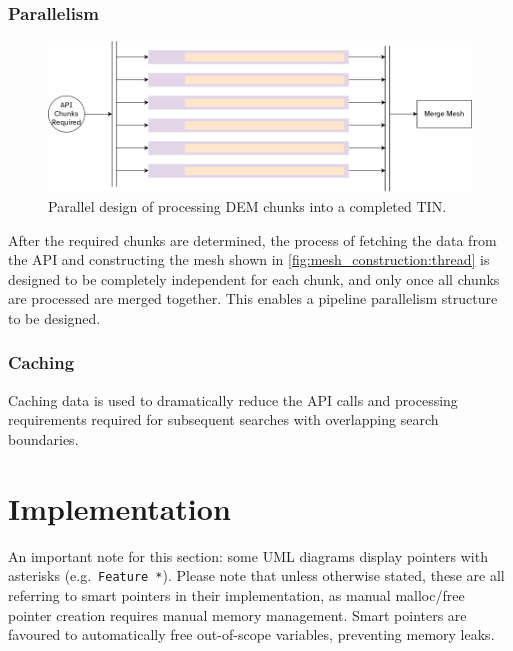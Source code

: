 \documentclass[12pt]{article}
\begin{document}
\subsubsection{Parallelism}

\begin{figure}[!htbp]
  \centering
  \includegraphics[width=1\textwidth]{assets/meshConstruction_parallel.png}
  \caption{Parallel design of processing DEM chunks into a completed TIN.}
\end{figure}

After the required chunks are determined, the process of fetching the data from the API and constructing the mesh shown in \autoref{fig:mesh_construction:thread} is designed to be completely independent for each chunk, and only once all chunks are processed are merged together. This enables a pipeline parallelism structure to be designed.

\subsubsection{Caching}

Caching data is used to dramatically reduce the API calls and processing requirements required for subsequent searches with overlapping search boundaries.


\section{Implementation}

An important note for this section: some UML diagrams display pointers with asterisks (e.g.\ \texttt{Feature *}). Please note that unless otherwise stated, these are all referring to smart pointers in their implementation, as manual malloc/free pointer creation requires manual memory management. Smart pointers are favoured to automatically free out-of-scope variables, preventing memory leaks.

\end{document}
